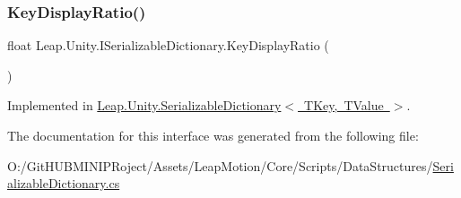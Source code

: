 \subsubsection{\texorpdfstring{KeyDisplayRatio()}{KeyDisplayRatio()}}
{\footnotesize\ttfamily float Leap.\+Unity.\+I\+Serializable\+Dictionary.\+Key\+Display\+Ratio (\begin{DoxyParamCaption}{ }\end{DoxyParamCaption})}



Implemented in \mbox{\hyperlink{class_leap_1_1_unity_1_1_serializable_dictionary_a237caec5f2755f82e24f0eedf9005968}{Leap.\+Unity.\+Serializable\+Dictionary$<$ T\+Key, T\+Value $>$}}.



The documentation for this interface was generated from the following file\+:\begin{DoxyCompactItemize}
\item 
O\+:/\+Git\+H\+U\+B\+M\+I\+N\+I\+P\+Roject/\+Assets/\+Leap\+Motion/\+Core/\+Scripts/\+Data\+Structures/\mbox{\hyperlink{_serializable_dictionary_8cs}{Serializable\+Dictionary.\+cs}}\end{DoxyCompactItemize}
